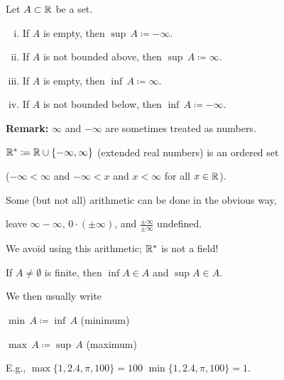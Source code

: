 \documentclass[10pt,aspectratio=169]{beamer}
\begin{document}
\begin{frame}


\begin{definition}
Let $A \subset {\mathbb{R}}$ be a set.
\begin{enumerate}[(i)]
\item \pause If $A$ is empty, then \quad $\sup\, A \coloneqq -\infty$.
\item \pause If $A$ is not bounded above, then \quad $\sup\, A \coloneqq \infty$.
\item \pause If $A$ is empty, then \quad $\inf\, A \coloneqq \infty$.
\item \pause If $A$ is not bounded below, then \quad $\inf\, A \coloneqq -\infty$.
\end{enumerate}
\end{definition}

\pause
\textbf{Remark:}
$\infty$ and $-\infty$ are sometimes treated as numbers.  

\medskip
\pause

${\mathbb{R}}^* \coloneqq {\mathbb{R}} \cup \{ -\infty , \infty\}$ (extended real numbers)
is an ordered set

($-\infty < \infty$ \quad and \quad
$-\infty < x$ and $x < \infty$ for all $x \in {\mathbb{R}}$).

\medskip
\pause

Some (but not all) arithmetic can be done in the obvious way,

\medskip
\pause

leave
$\infty-\infty$, $0 \cdot (\pm\infty)$, and $\frac{\pm\infty}{\pm\infty}$
undefined.

\medskip
\pause

We avoid using this arithmetic;
${\mathbb{R}}^*$ is not a field!

\end{frame}

\begin{frame}
If $A \not= \emptyset$ is finite, then
$\inf A \in A$
and
$\sup A \in A$.

\medskip
\pause

We then usually write

\medskip

$\min\, A \coloneqq \inf\, A$ \qquad (minimum)

\medskip

$\max\, A \coloneqq \sup\, A$ \qquad (maximum)

\medskip
\pause

E.g., \qquad
$\max \{ 1,2.4,\pi,100 \} = 100$ \qquad
$\min \{ 1,2.4,\pi,100 \} = 1$.
\end{frame}
\end{document}
